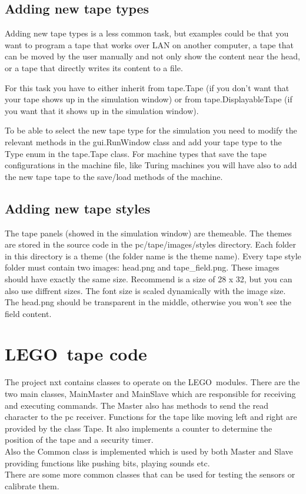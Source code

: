 \documentclass[%
  a4paper,%
  11pt,%
  blue,%
  hyperref	%
  ]{tubsartcl}
\begin{document}
\subsection{Adding new tape types}

Adding new tape types is a less common task, but examples could be that you want to program a tape that works over LAN on another computer, a tape that can be moved by the user manually and not only show the content near the head, or a tape that directly writes its content to a file.

For this task you have to either inherit from tape.Tape (if you don't want that your tape shows up in the simulation window) or from tape.DisplayableTape (if you want that it shows up in the simulation window). 

To be able to select the new tape type for the simulation you need to modify the relevant methods in the gui.RunWindow class and add your tape type to the Type enum in the tape.Tape class. For machine types that save the tape configurations in the machine file, like Turing machines you will have also to add the new tape tape to the save/load methods of the machine.

\subsection{Adding new tape styles}
\label{sec:adding-new-tape}

The tape panels (showed in the simulation window) are themeable. The themes are stored in the source code in the pc/tape/images/styles directory. Each folder in this directory is a theme (the folder name is the theme name). Every tape style folder must contain two images: head.png and tape\_field.png. These images should have exactly the same size. Recommend is a size of 28 x 32, but you can also use diffrent sizes. The font size is scaled dynamically with the image size. The head.png should be transparent in the middle, otherwise you won't see the field content.


\section{LEGO\textregistered\, tape code}
\label{sec:lego}

The project nxt contains classes to operate on the LEGO\textregistered\, modules. There are the two main classes, MainMaster and MainSlave which are responsible for receiving and executing commands. The Master also has methods to send the read character to the pc receiver. Functions for the tape like moving left and right are provided by the class Tape. It also implements a counter to determine the position of the tape and a security timer. \\
Also the Common class is implemented which is used by both Master and Slave providing functions like pushing bits, playing sounds etc.\\
There are some more common classes that can be used for testing the sensors or calibrate them.
\end{document}
